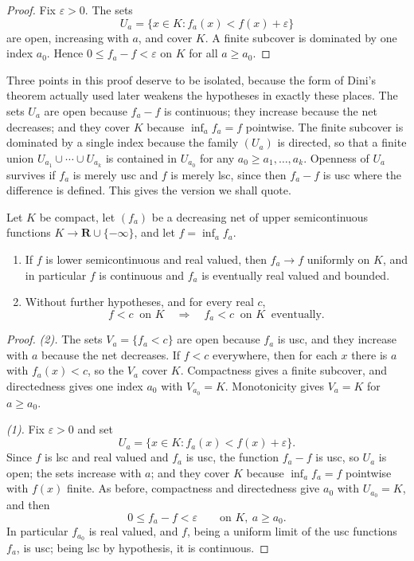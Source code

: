 \begin{proof}
Fix $\varepsilon>0$.  The sets
\[
                     U_a=\{x\in K:f_a(x)<f(x)+\varepsilon\}
\]
are open, increasing with $a$, and cover $K$.  A finite subcover is dominated
by one index $a_0$.  Hence $0\leq f_a-f<\varepsilon$ on $K$ for all
$a\geq a_0$.
\end{proof}

Three points in this proof deserve to be isolated, because the form of Dini's
theorem actually used later weakens the hypotheses in exactly these places.
The sets $U_a$ are open because $f_a-f$ is continuous; they increase because
the net decreases; and they cover $K$ because $\inf_af_a=f$ pointwise.  The
finite subcover is dominated by a single index because the family $(U_a)$ is
directed, so that a finite union $U_{a_1}\cup\cdots\cup U_{a_k}$ is contained
in $U_{a_0}$ for any $a_0\geq a_1,\dots,a_k$.  Openness of $U_a$ survives if
$f_a$ is merely usc and $f$ is merely lsc, since then $f_a-f$ is usc where the
difference is defined.  This gives the version we shall quote.

\begin{proposition}
\label{prop:dini-usc}
Let $K$ be compact, let $(f_a)$ be a decreasing net of upper semicontinuous
functions $K\to\mathbf R\cup\{-\infty\}$, and let $f=\inf_af_a$.
\begin{enumerate}
\item If $f$ is lower semicontinuous and real valued, then $f_a\to f$
  uniformly on $K$, and in particular $f$ is continuous and $f_a$ is
  eventually real valued and bounded.
\item Without further hypotheses, and for every real $c$,
\[
 f<c\ \text{ on }K
 \quad\Longrightarrow\quad
 f_a<c\ \text{ on }K\ \text{ eventually}.
\]
\end{enumerate}
\par
\end{proposition}

\begin{proof}
\emph{(2).}  The sets $V_a=\{f_a<c\}$ are open because $f_a$ is usc, and they
increase with $a$ because the net decreases.  If $f<c$ everywhere, then for
each $x$ there is $a$ with $f_a(x)<c$, so the $V_a$ cover $K$.  Compactness
gives a finite subcover, and directedness gives one index $a_0$ with
$V_{a_0}=K$.  Monotonicity gives $V_a=K$ for $a\geq a_0$.

\emph{(1).}  Fix $\varepsilon>0$ and set
\[
 U_a=\{x\in K:f_a(x)<f(x)+\varepsilon\}.
\]
Since $f$ is lsc and real valued and $f_a$ is usc, the function $f_a-f$ is
usc, so $U_a$ is open; the sets increase with $a$; and they cover $K$ because
$\inf_af_a=f$ pointwise with $f(x)$ finite.  As before, compactness and
directedness give $a_0$ with $U_{a_0}=K$, and then
\[
 0\leq f_a-f<\varepsilon\qquad\text{on }K,\ a\geq a_0 .
\]
In particular $f_{a_0}$ is real valued, and $f$, being a uniform limit of the
usc functions $f_a$, is usc; being lsc by hypothesis, it is continuous.
\end{proof}

